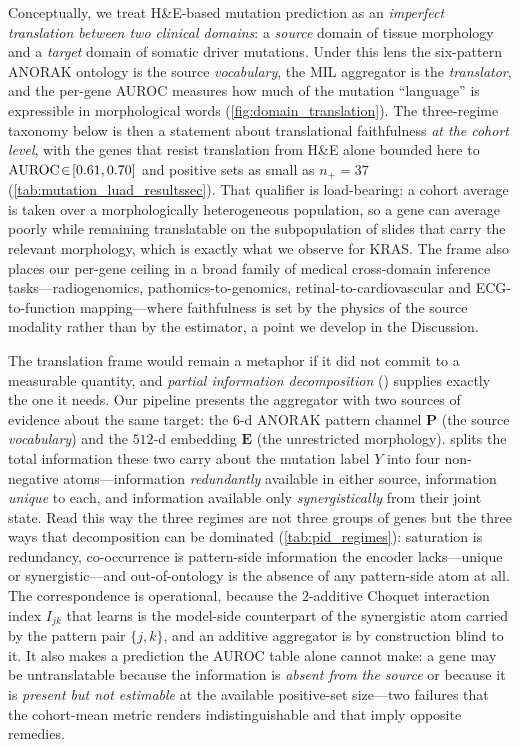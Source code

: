 Conceptually, we treat H\&E-based mutation prediction as an
\emph{imperfect translation between two clinical domains}: a
\emph{source} domain of tissue morphology and a \emph{target}
domain of somatic driver mutations.
Under this lens the six-pattern ANORAK ontology is the source
\emph{vocabulary}, the MIL aggregator is the \emph{translator}, and
the per-gene AUROC measures how much of the mutation ``language''
is expressible in morphological words
(\cref{fig:domain_translation}).
The three-regime taxonomy below is then a statement about
translational faithfulness \emph{at the cohort level}, with the
genes that resist translation from H\&E alone bounded here to
$\text{AUROC}\!\in\![0.61,0.70]$ and positive sets as small as
$n_+\!=\!37$ (\cref{tab:mutation_luad_resultssec}).
That qualifier is load-bearing: a cohort average is taken over a
morphologically heterogeneous population, so a gene can average
poorly while remaining translatable on the subpopulation of slides
that carry the relevant morphology, which is exactly what we observe
for KRAS.
The frame also places our per-gene ceiling in a
broad family of medical cross-domain inference tasks---radiogenomics,
pathomics-to-genomics, retinal-to-cardiovascular and
ECG-to-function mapping---where faithfulness is set by the physics
of the source modality rather than by the estimator, a point we
develop in the Discussion.

The translation frame would remain a metaphor if it did not commit
to a measurable quantity, and \emph{partial information
decomposition} (\pid{})\cite{williams2010pid,bertschinger2014unique}
supplies exactly the one it needs.
Our pipeline presents the aggregator with two sources of evidence
about the same target: the $6$-d ANORAK pattern channel
$\mathbf{P}$ (the source \emph{vocabulary}) and the $512$-d
\ctranspath{} embedding $\mathbf{E}$ (the unrestricted morphology).
\pid{} splits the total information these two carry about the
mutation label $Y$ into four non-negative atoms---information
\emph{redundantly} available in either source, information
\emph{unique} to each, and information available only
\emph{synergistically} from their joint state.
Read this way the three regimes are not three groups of genes but
the three ways that decomposition can be dominated
(\cref{tab:pid_regimes}): saturation is redundancy, co-occurrence
is pattern-side information the encoder lacks---unique or
synergistic---and out-of-ontology is the absence of any pattern-side
atom at all.
The correspondence is operational, because
the $2$-additive Choquet interaction index $I_{jk}$ that
\fcmil{} learns is the model-side counterpart of the synergistic
atom carried by the pattern pair $\{j,k\}$, and an additive
aggregator is by construction blind to it.
It also makes a prediction the AUROC table alone cannot make: a
gene may be untranslatable because the information is \emph{absent
from the source} or because it is \emph{present but not estimable}
at the available positive-set size---two failures that the
cohort-mean metric renders indistinguishable and that imply
opposite remedies.

